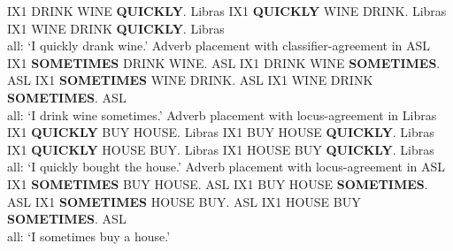 \documentclass[output=paper]{langscibook}
\begin{document}
    \ex 
        {IX1 DRINK}\laszHs{\laszClaw} {WINE} \textbf{{QUICKLY}}.
        \hfill \cmark Libras
    \ex 
        {IX1} \textbf{{QUICKLY}} {WINE DRINK}\laszHs{\laszClaw}.
        \hfill \cmark Libras
    \ex 
        {IX1 WINE DRINK}\laszHs{\laszClaw} \textbf{{QUICKLY}}. 
        \hfill \cmark Libras
        \\ 
        \glt all: ‘I quickly drank wine.’
    \z 
\ex 
    \label{lasz:ex:25}
    Adverb placement with classifier-agreement in ASL
    \ea 
        {IX1} \textbf{{SOMETIMES}} {DRINK}\laszHs{\laszClaw} {WINE}.
        \hfill \cmark ASL
    \ex 
        {IX1 DRINK}\laszHs{\laszClaw} {WINE} \textbf{{SOMETIMES}}.
        \hfill \cmark ASL
    \ex 
        {IX1} \textbf{{SOMETIMES}} {WINE DRINK}\laszHs{\laszClaw}.
        \hfill \cmark ASL
    \ex 
        {IX1 WINE DRINK}\laszHs{\laszClaw} \textbf{{SOMETIMES}}. 
        \hfill \cmark ASL
        \\ 
        \glt all: ‘I drink wine sometimes.’
    \z 
\ex 
    \label{lasz:ex:26}
    Adverb placement with locus-agreement in Libras
    \ea 
        {IX1} \textbf{{QUICKLY}} {BUY} {HOUSE}.
        \hfill \cmark Libras
    \ex 
        {IX1} {BUY} {HOUSE} \textbf{{QUICKLY}}.
        \hfill \cmark Libras
    \ex 
        {IX1} \textbf{{QUICKLY}} {HOUSE} {BUY}.
        \hfill \cmark Libras
    \ex 
        {IX1 {HOUSE}} {BUY} \textbf{{QUICKLY}}. 
        \hfill \cmark Libras
        \\ 
        \glt all: ‘I quickly bought the house.’
    \z 
\ex
    \label{lasz:ex:27}
    Adverb placement with locus-agreement in ASL
    \ea 
        {IX1} \textbf{{SOMETIMES}} {BUY} {HOUSE}.
        \hfill \cmark ASL
    \ex 
        {IX1} {BUY} {HOUSE} \textbf{{SOMETIMES}}.
        \hfill \cmark ASL
    \ex 
        {IX1} \textbf{{SOMETIMES}} {HOUSE} {BUY}.
        \hfill \cmark ASL
    \ex 
        {IX1 {HOUSE}} {BUY} \textbf{{SOMETIMES}}. 
        \hfill \cmark ASL
        \\ 
        all: `I sometimes buy a house.' 
    \z 
\z 
\end{document}
